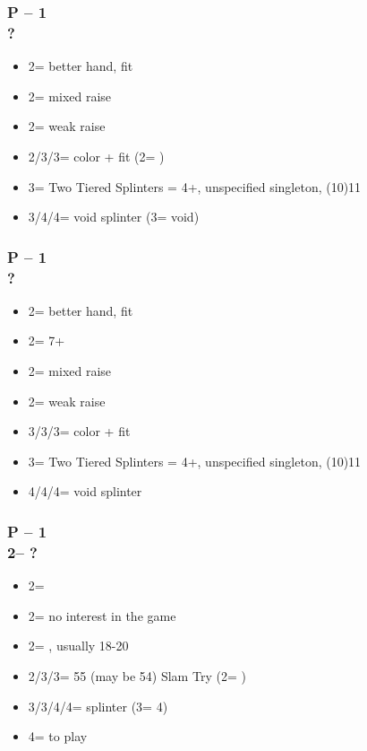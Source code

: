 \documentclass[12pt, a4paper]{report}
\begin{document}
{{{            \subsubsection*{P -- 1\hearts \\ ?}
            \begin{itemize}
                \item 2\clubs = better hand, fit
                \item 2\diams = mixed raise
                \item 2\hearts = weak raise
                \item 2\nt/3\clubs/3\diams = color + fit (2\nt = \spades)
                \item 3\spades = Two Tiered Splinters = 4+\hearts, unspecified singleton, (10)11\dps
                \item 3\nt/4\clubs/4\diams = void splinter (3\nt = \spades void)
            \end{itemize}

            \subsubsection*{P -- 1\spades \\ ?}
            \begin{itemize}
                \item 2\clubs = better hand, fit
                \item 2\diams = \trsf{\hearts} 7+
                \item 2\hearts = mixed raise
                \item 2\spades = weak raise
                \item 3\clubs/3\diams/3\hearts = color + fit
                \item 3\nt = Two Tiered Splinters = 4+\spades, unspecified singleton, (10)11\dps
                \item 4\clubs/4\diams/4\hearts = void splinter
            \end{itemize}

            \subsubsection*{P -- 1\hearts \\ 2\clubs -- ?}
            \begin{itemize}
                \item 2\diams = \inv
                \item 2\hearts = no interest in the game
                \item 2\spades = \ahsf, usually 18-20 \bal
                \item 2\nt/3\clubs/3\diams = 55 (may be 54) Slam Try (2\nt = \spades)
                \item 3\nt/3\spades/4\clubs/4\diams = splinter (3\nt = 4\diams)
                \item 4\hearts = to play
            \end{itemize}

}}}
\end{document}
